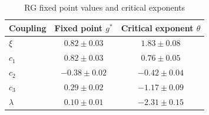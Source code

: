 \documentclass[aps,prd,twocolumn,showpacs,superscriptaddress,groupedaddress,nofootinbib]{revtex4-2}
\begin{document}
\begin{table}[h]
\caption{RG fixed point values and critical exponents}
\begin{ruledtabular}
\begin{tabular}{lcc}
Coupling & Fixed point $g^*$ & Critical exponent $\theta$ \\
\hline
$\xi$ & $0.82 \pm 0.03$ & $1.83 \pm 0.08$ \\
$c_1$ & $0.82 \pm 0.03$ & $0.76 \pm 0.05$ \\
$c_2$ & $-0.38 \pm 0.02$ & $-0.42 \pm 0.04$ \\
$c_3$ & $0.29 \pm 0.02$ & $-1.17 \pm 0.09$ \\
$\lambda$ & $0.10 \pm 0.01$ & $-2.31 \pm 0.15$ \\
\end{tabular}
\end{ruledtabular}
\end{table}
\end{document}
